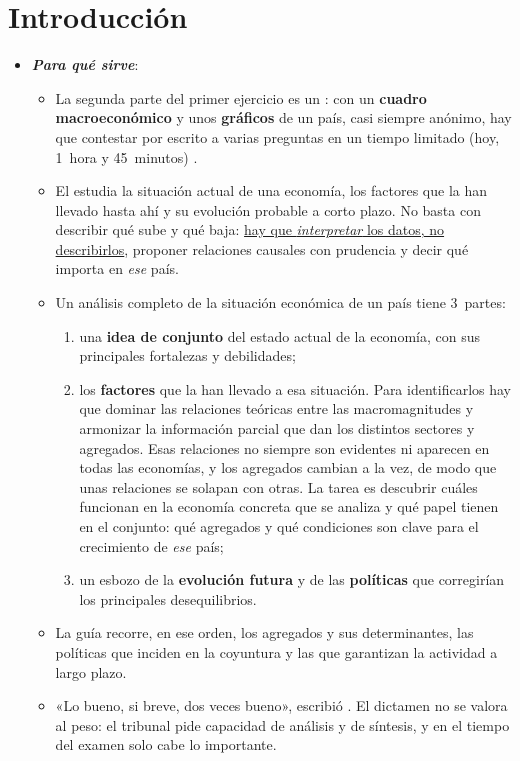 \documentclass[11pt]{article}
\begin{document}
\tceetitulo

\section*{Introducción}

\begin{itemize}
\item \textbf{\emph{Para qué sirve}}:
  \begin{itemize}
  \item La segunda parte del primer ejercicio es un : con un \textbf{cuadro macroeconómico} y unos \textbf{gráficos} de un país, casi siempre anónimo, hay que contestar por escrito a varias preguntas en un tiempo limitado (hoy, 1~hora y 45~minutos) \parencite{BOE2025ConvocatoriaTCEE}.
  \item El  estudia la situación actual de una economía, los factores que la han llevado hasta ahí y su evolución probable a corto plazo. No basta con describir qué sube y qué baja: \uline{hay que \emph{interpretar} los datos, no describirlos}, proponer relaciones causales con prudencia y decir qué importa en \emph{ese} país.
  \item Un análisis completo de la situación económica de un país tiene 3~partes:
    \begin{enumerate}
    \item una \textbf{idea de conjunto} del estado actual de la economía, con sus principales fortalezas y debilidades;
    \item los \textbf{factores} que la han llevado a esa situación. Para identificarlos hay que dominar las relaciones teóricas entre las macromagnitudes y armonizar la información parcial que dan los distintos sectores y agregados. Esas relaciones no siempre son evidentes ni aparecen en todas las economías, y los agregados cambian a la vez, de modo que unas relaciones se solapan con otras. La tarea es descubrir cuáles funcionan en la economía concreta que se analiza y qué papel tienen en el conjunto: qué agregados y qué condiciones son clave para el crecimiento de \emph{ese} país;
    \item un esbozo de la \textbf{evolución futura} y de las \textbf{políticas} que corregirían los principales desequilibrios.
    \end{enumerate}
  \item La guía recorre, en ese orden, los agregados y sus determinantes, las políticas que inciden en la coyuntura y las que garantizan la actividad a largo plazo.
  \item «Lo bueno, si breve, dos veces bueno», escribió . El dictamen no se valora al peso: el tribunal pide capacidad de análisis y de síntesis, y en el tiempo del examen solo cabe lo importante.
  \end{itemize}


\end{itemize}
\end{document}
